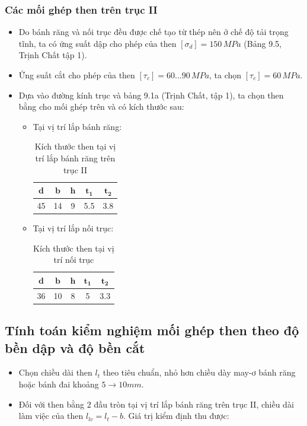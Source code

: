 \subsubsection{Các mối ghép then trên trục II}
\begin{itemize}
    \item Do bánh răng và nối trục đều được chế tạo từ thép nên ở chế độ tải trọng tĩnh, ta có ứng suất dập cho phép của then $[\sigma_d] = 150 \, MPa$ (Bảng 9.5, Trịnh Chất tập 1).
    \item Ứng suất cắt cho phép của then $[\tau_c] = 60 \dots 90 \, MPa$, ta chọn $[\tau_c] = 60 \, MPa$.
    \item Dựa vào đường kính trục và bảng 9.1a (Trịnh Chất, tập 1), ta chọn then bằng cho mối ghép trên và có kích thước sau:
    \begin{itemize}
        \item Tại vị trí lắp bánh răng:
        \begin{table}[h!]
        \centering
        \begin{tabular}{|c|c|c|c|c|}
        \hline
        $\mathbf{d}$ & $\mathbf{b}$ & $\mathbf{h}$ & $\mathbf{t_1}$ & $\mathbf{t_2}$ \\
        \hline
        45 & 14 & 9 & 5.5 & 3.8 \\
        \hline
        \end{tabular}
        \caption{Kích thước then tại vị trí lắp bánh răng trên trục II}
        \end{table}
        \item Tại vị trí lắp nối trục:
        \begin{table}[h!]
        \centering
        \begin{tabular}{|c|c|c|c|c|}
        \hline
        $\mathbf{d}$ & $\mathbf{b}$ & $\mathbf{h}$ & $\mathbf{t_1}$ & $\mathbf{t_2}$ \\
        \hline
        36 & 10 & 8 & 5 & 3.3 \\
        \hline
        \end{tabular}
        \caption{Kích thước then tại vị trí nối trục}
        \end{table}
    \end{itemize}
\end{itemize}
\subsection{Tính toán kiểm nghiệm mối ghép then theo độ bền dập và độ bền cắt}
\begin{itemize}
    \item Chọn chiều dài then $l_t$ theo tiêu chuẩn, nhỏ hơn chiều dày may-ơ bánh răng hoặc bánh đai khoảng $5 \rightarrow 10mm$.
    \item Đối với then bằng 2 đầu tròn tại vị trí lắp bánh răng trên trục II, chiều dài làm việc của then $l_{lv} = l_t - b$. Giá trị kiểm định thu được:
\end{itemize}

